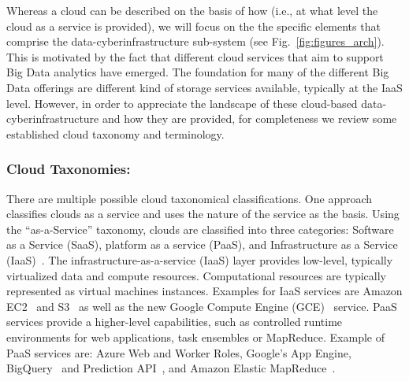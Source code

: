 \documentclass[times]{cpeauth}
\newcommand{\jhanote}[1]{ {\textcolor{red} { ***shantenu: #1 }}}
\newcommand{\alnote}[1]{ {\textcolor{green} { ***andreL: #1 }}}
\newcommand{\alnote}[1]{}
\newcommand{\jhanote}[1]{}
\begin{document}

Whereas a cloud can be described on the basis of how (i.e., at what
level the cloud as a service is provided), we will focus on the the
specific elements that comprise the data-cyberinfrastructure
sub-system (see Fig.~\ref{fig:figures_arch}).  This is motivated by
the fact that different cloud services that aim to support Big Data
analytics have emerged.  The foundation for many of the different Big
Data offerings are different kind of storage services available,
typically at the IaaS level.  However, in order to appreciate the
landscape of these cloud-based data-cyberinfrastructure and how they
are provided, for completeness we review some established cloud
taxonomy and terminology.

\subsubsection*{Cloud Taxonomies: }
There are multiple possible cloud taxonomical classifications. One
approach classifies clouds as a service and uses the nature of the
service as the basis. Using the ``as-a-Service'' taxonomy, clouds are
classified into three categories: Software as a Service (SaaS),
platform as a service (PaaS), and Infrastructure as a Service
(IaaS)~\cite{Jha:2010kx}. The infrastructure-as-a-service (IaaS) layer
provides low-level, typically virtualized data and compute resources.
Computational resources are typically represented as virtual machines
instances. Examples for IaaS services are Amazon EC2~\cite{amazon_ec2}
and S3~\cite{amazons3} as well as the new Google Compute Engine
(GCE)~\cite{gce} service. PaaS services provide a higher-level
capabilities, such as controlled runtime environments for web
applications, task ensembles or MapReduce.  Example of PaaS services
are: Azure Web and Worker Roles, Google's App Engine,
BigQuery~\cite{google-bigquery} and Prediction
API~\cite{google-predication-api}, and Amazon Elastic
MapReduce~\cite{amazonemr}.
\end{document}
